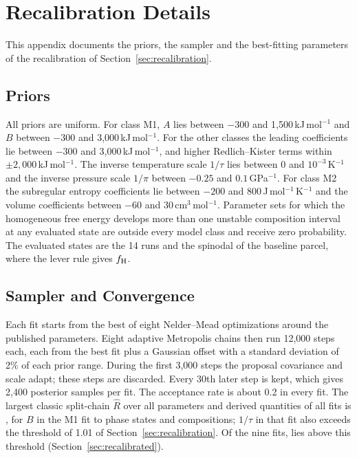 \chapter{Recalibration Details}\label{app:recalibration}

This appendix documents the priors, the sampler and the best-fitting parameters of the
recalibration of Section~\ref{sec:recalibration}.

\section{Priors}

All priors are uniform. For class M1, $A$ lies between $-300$ and 1,500\,kJ\,mol$^{-1}$ and $B$
between $-300$ and 3,000\,kJ\,mol$^{-1}$. For the other classes the leading coefficients lie
between $-300$ and 3,000\,kJ\,mol$^{-1}$, and higher Redlich--Kister terms within
$\pm2{,}000$\,kJ\,mol$^{-1}$. The
inverse temperature scale $1/\tau$ lies between 0 and $10^{-3}$\,K$^{-1}$ and the inverse
pressure scale $1/\pi$ between $-0.25$ and $0.1$\,GPa$^{-1}$. For class M2 the subregular
entropy coefficients lie between $-200$ and 800\,J\,mol$^{-1}$\,K$^{-1}$ and the volume
coefficients between $-60$ and 30\,cm$^3$\,mol$^{-1}$. Parameter sets for which the homogeneous
free energy develops more than one unstable composition interval at any evaluated state are
outside every model class and receive zero probability. The evaluated states are the 14 runs
and the spinodal of the baseline parcel, where the lever rule gives $f_{\rm H}$.

\section{Sampler and Convergence}

Each fit starts from the best of eight Nelder--Mead optimizations around the published
parameters. Eight adaptive Metropolis chains \cite{haario2001} then run 12,000 steps each,
each from the best fit plus a Gaussian offset with a standard deviation of 2\% of each prior
range. During the first 3,000 steps the proposal covariance and scale adapt; these steps are
discarded. Every 30th later step is kept, which gives 2,400 posterior samples per fit. The
acceptance rate is about 0.2 in every fit. The largest classic split-chain $\hat R$
\cite{gelman2013} over all parameters and derived quantities of all fits is \maxRhat{}, for $B$
in the M1 fit to phase states and compositions; $1/\tau$ in that fit also exceeds the threshold
of 1.01 of Section~\ref{sec:recalibration}. Of the nine fits, \nRhatAbove{} lies above this
threshold (Section~\ref{sec:recalibrated}).

